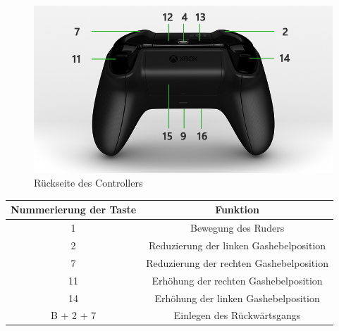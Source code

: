 \begin{figure}[H]
    \centering
    \includegraphics[scale=0.5]{images/rueckseite.jpg}
    \caption{Rückseite des Controllers}
    \label{fig:rueckseite}
\end{figure}

\begin{table}[H]
    \begin{tabular}{|c|c|}
    \hline
    \rowcolor[gray]{0.8}
     Nummerierung der Taste & Funktion \\ \hline 
     1 & Bewegung des Ruders \\ \hline 
     2 & Reduzierung der linken Gashebelposition \\ \hline 
     7 & Reduzierung der rechten Gashebelposition \\ \hline
     11 & Erhöhung der rechten Gashebelposition \\ \hline
     14 & Erhöhung der linken Gashebelposition \\ \hline
     B + 2 + 7 & Einlegen des Rückwärtsgangs \\ \hline
    \end{tabular}
\end{table}

